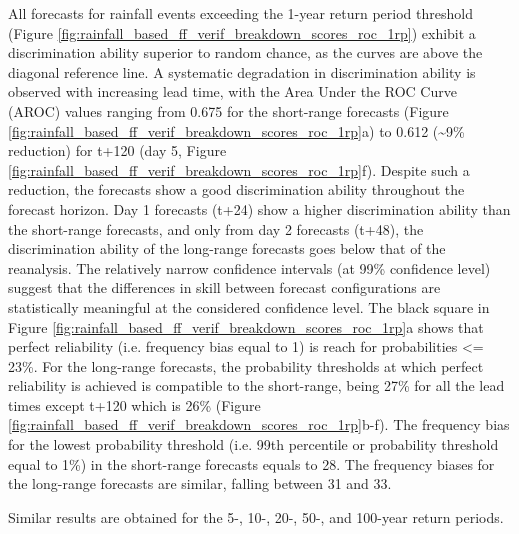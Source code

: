 All  forecasts for rainfall events exceeding the 1-year return period threshold (Figure \ref{fig:rainfall_based_ff_verif_breakdown_scores_roc_1rp}) exhibit a discrimination ability superior to random chance, as the curves are above the diagonal reference line. A systematic degradation in discrimination ability is observed with increasing lead time, with the Area Under the ROC Curve (AROC) values ranging from 0.675 for the short-range forecasts (Figure \ref{fig:rainfall_based_ff_verif_breakdown_scores_roc_1rp}a) to 0.612 (\sim9\% reduction) for t+120 (day 5, Figure \ref{fig:rainfall_based_ff_verif_breakdown_scores_roc_1rp}f). Despite such a reduction, the forecasts show a good discrimination ability throughout the forecast horizon. Day 1 forecasts (t+24) show a higher discrimination ability than the short-range forecasts, and only from day 2 forecasts (t+48), the discrimination ability of the long-range forecasts goes below that of the reanalysis. The relatively narrow confidence intervals (at 99\% confidence level) suggest that the differences in skill between forecast configurations are statistically meaningful at the considered confidence level. The black square in Figure \ref{fig:rainfall_based_ff_verif_breakdown_scores_roc_1rp}a shows that perfect reliability (i.e. frequency bias equal to 1) is reach for probabilities <= 23\%. For the long-range forecasts, the probability thresholds at which perfect reliability is achieved is compatible to the short-range, being 27\% for all the lead times except t+120 which is 26\% (Figure \ref{fig:rainfall_based_ff_verif_breakdown_scores_roc_1rp}b-f). The frequency bias for the lowest probability threshold (i.e. 99th percentile or probability threshold equal to 1\%) in the short-range forecasts equals to 28. The frequency biases for the long-range forecasts are similar, falling between 31 and 33. 

Similar results are obtained for the 5-, 10-, 20-, 50-, and 100-year return periods.

